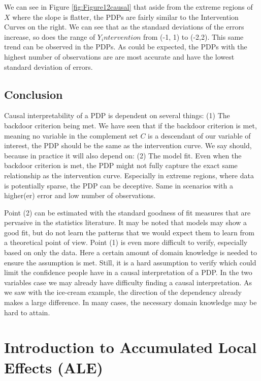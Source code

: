\documentclass[]{krantz}
\begin{document}
We can see in Figure \ref{fig:Figure12causal} that aside from the
extreme regions of \(X\) where the slope is flatter, the PDPs are fairly
similar to the Intervention Curves on the right. We can see that as the
standard deviations of the errors increase, so does the range of
\(Y_intervention\) from (-1, 1) to (-2,2). This same trend can be
observed in the PDPs. As could be expected, the PDPs with the highest
number of observations are are most accurate and have the lowest
standard deviation of errors.

\section{Conclusion}\label{conclusion}

Causal interpretability of a PDP is dependent on several things: (1) The
backdoor criterion being met. We have seen that if the backdoor
criterion is met, meaning no variable in the complement set \(C\) is a
descendant of our variable of interest, the PDP should be the same as
the intervention curve. We say should, because in practice it will also
depend on: (2) The model fit. Even when the backdoor criterion is met,
the PDP might not fully capture the exact same relationship as the
intervention curve. Especially in extreme regions, where data is
potentially sparse, the PDP can be deceptive. Same in scenarios with a
higher(er) error and low number of observations.

Point (2) can be estimated with the standard goodness of fit measures
that are pervasive in the statistics literature. It may be noted that
models may show a good fit, but do not learn the patterns that we would
expect them to learn from a theoretical point of view. Point (1) is even
more difficult to verify, especially based on only the data. Here a
certain amount of domain knowledge is needed to ensure the assumption is
met. Still, it is a hard assumption to verify which could limit the
confidence people have in a causal interpretation of a PDP. In the two
variables case we may already have difficulty finding a causal
interpretation. As we saw with the ice-cream example, the direction of
the dependency already makes a large difference. In many cases, the
necessary domain knowledge may be hard to attain.

\chapter{Introduction to Accumulated Local Effects (ALE)}\label{ale}
\end{document}
